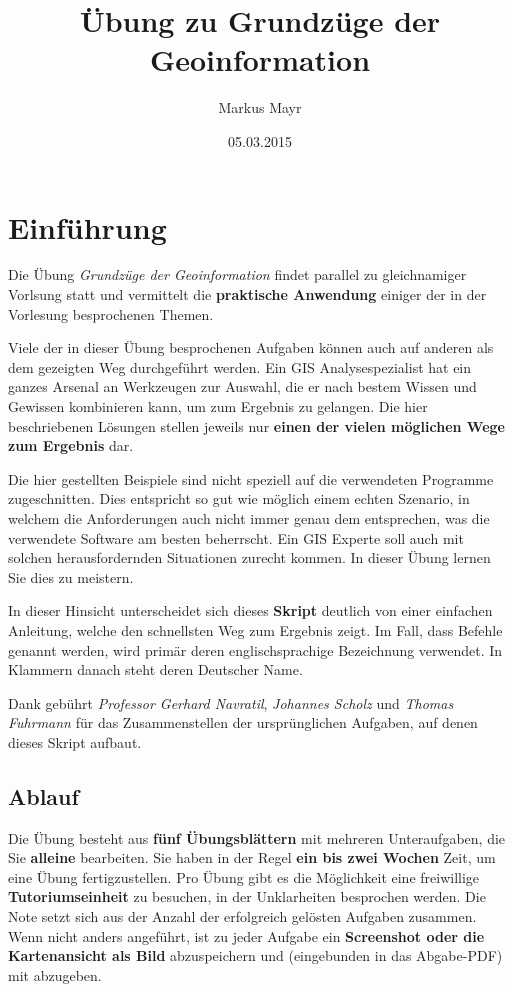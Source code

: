 \documentclass[a4paper,12pt,ngerman]{sphinxmanual}
\title{Übung zu Grundzüge der Geoinformation}
\date{05.03.2015}
\author{Markus Mayr}
\begin{document}
\maketitle
\tableofcontents
{}\label{index::doc}



\chapter{Einführung}
\label{intro:einfuhrung}\label{intro::doc}\label{intro:ubungsblatter-zu-grundzuge-der-geoinformation}
Die Übung \emph{Grundzüge der Geoinformation} findet parallel zu gleichnamiger Vorlsung statt und vermittelt die \textbf{praktische Anwendung} einiger der in der Vorlesung besprochenen Themen.

Viele der in dieser Übung besprochenen Aufgaben können auch auf anderen als dem gezeigten Weg durchgeführt werden. Ein GIS Analysespezialist hat ein ganzes Arsenal an Werkzeugen zur Auswahl, die er nach bestem Wissen und Gewissen kombinieren kann, um zum Ergebnis zu gelangen. Die hier beschriebenen Lösungen stellen jeweils nur \textbf{einen der vielen möglichen Wege zum Ergebnis} dar.

Die hier gestellten Beispiele sind nicht speziell auf die verwendeten Programme zugeschnitten. Dies entspricht so gut wie möglich einem echten Szenario, in welchem die Anforderungen auch nicht immer genau dem entsprechen, was die verwendete Software am besten beherrscht.
Ein GIS Experte soll auch mit solchen herausfordernden Situationen zurecht kommen. In dieser Übung lernen Sie dies zu meistern.

In dieser Hinsicht unterscheidet sich dieses \textbf{Skript} deutlich von einer einfachen Anleitung, welche den schnellsten Weg zum Ergebnis zeigt.
Im Fall, dass Befehle genannt werden, wird primär deren englischsprachige Bezeichnung verwendet. In Klammern danach steht deren Deutscher Name.

Dank gebührt \emph{Professor Gerhard Navratil}, \emph{Johannes Scholz} und \emph{Thomas Fuhrmann} für das Zusammenstellen der ursprünglichen Aufgaben, auf denen dieses Skript aufbaut.


\section{Ablauf}
\label{intro:ablauf}
Die Übung besteht aus \textbf{fünf Übungsblättern} mit mehreren Unteraufgaben, die Sie \textbf{alleine} bearbeiten.
Sie haben in der Regel \textbf{ein bis zwei Wochen} Zeit, um eine Übung fertigzustellen.
Pro Übung gibt es die Möglichkeit eine freiwillige \textbf{Tutoriumseinheit} zu besuchen, in der Unklarheiten besprochen werden.
Die Note setzt sich aus der Anzahl der erfolgreich gelösten Aufgaben zusammen.
Wenn nicht anders angeführt, ist zu jeder Aufgabe ein \textbf{Screenshot oder die Kartenansicht als Bild} abzuspeichern und (eingebunden in das Abgabe-PDF) mit abzugeben.
\end{document}
